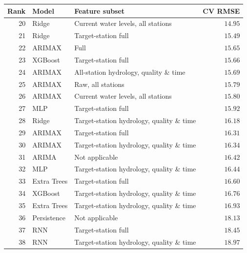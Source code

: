 \begin{tabularx}{\textwidth}{@{}rlXr@{}}
\toprule
\textbf{Rank} & \textbf{Model} & \textbf{Feature subset} & \textbf{CV RMSE} \\
\midrule
20 & Ridge & Current water levels, all stations & $14.95$ \\
21 & Ridge & Target-station full & $15.49$ \\
22 & ARIMAX & Full & $15.65$ \\
23 & XGBoost & Target-station full & $15.66$ \\
24 & ARIMAX & All-station hydrology, quality \& time & $15.69$ \\
25 & ARIMAX & Raw, all stations & $15.79$ \\
26 & ARIMAX & Current water levels, all stations & $15.80$ \\
27 & MLP & Target-station full & $15.92$ \\
28 & Ridge & Target-station hydrology, quality \& time & $16.18$ \\
29 & ARIMAX & Target-station full & $16.31$ \\
30 & ARIMAX & Target-station hydrology, quality \& time & $16.34$ \\
31 & ARIMA & Not applicable & $16.42$ \\
32 & MLP & Target-station hydrology, quality \& time & $16.44$ \\
33 & Extra Trees & Target-station full & $16.60$ \\
34 & XGBoost & Target-station hydrology, quality \& time & $16.76$ \\
35 & Extra Trees & Target-station hydrology, quality \& time & $16.93$ \\
36 & Persistence & Not applicable & $18.13$ \\
37 & RNN & Target-station full & $18.45$ \\
38 & RNN & Target-station hydrology, quality \& time & $18.97$ \\
\bottomrule
\end{tabularx}
